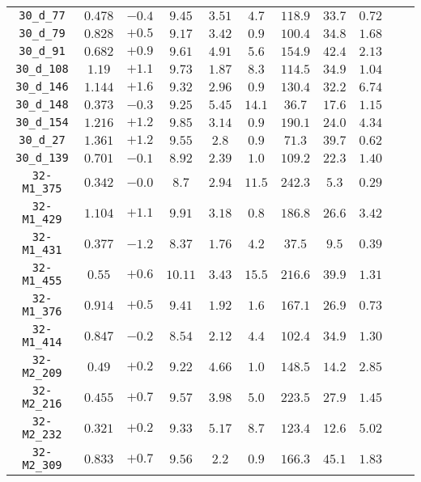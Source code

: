 \begin{table}[htbp]
\begin{tabular}{c c c c c c c c c c c}
\texttt{30\_d\_77}      & $0.478$ & $-0.4$ & $9.45 $ & $3.51 $ & $4.7 $ & $118.9$ & $33.7$ & $0.72$ \\
\texttt{30\_d\_79}      & $0.828$ & $+0.5$ & $9.17 $ & $3.42 $ & $0.9 $ & $100.4$ & $34.8$ & $1.68$ \\
\texttt{30\_d\_91}      & $0.682$ & $+0.9$ & $9.61 $ & $4.91 $ & $5.6 $ & $154.9$ & $42.4$ & $2.13$ \\
\texttt{30\_d\_108}     & $ 1.19$ & $+1.1$ & $9.73 $ & $1.87 $ & $8.3 $ & $114.5$ & $34.9$ & $1.04$ \\
\texttt{30\_d\_146}     & $1.144$ & $+1.6$ & $9.32 $ & $2.96 $ & $0.9 $ & $130.4$ & $32.2$ & $6.74$ \\
\texttt{30\_d\_148}     & $0.373$ & $-0.3$ & $9.25 $ & $5.45 $ & $14.1$ & $36.7 $ & $17.6$ & $1.15$ \\
\texttt{30\_d\_154}     & $1.216$ & $+1.2$ & $9.85 $ & $3.14 $ & $0.9 $ & $190.1$ & $24.0$ & $4.34$ \\
\texttt{30\_d\_27}      & $1.361$ & $+1.2$ & $9.55 $ & $2.8  $ & $0.9 $ & $71.3 $ & $39.7$ & $0.62$ \\
\texttt{30\_d\_139}     & $0.701$ & $-0.1$ & $8.92 $ & $2.39 $ & $1.0 $ & $109.2$ & $22.3$ & $1.40$ \\
\texttt{32-M1\_375}     & $0.342$ & $-0.0$ & $8.7  $ & $2.94 $ & $11.5$ & $242.3$ & $5.3 $ & $0.29$ \\
\texttt{32-M1\_429}     & $1.104$ & $+1.1$ & $9.91 $ & $3.18 $ & $0.8 $ & $186.8$ & $26.6$ & $3.42$ \\
\texttt{32-M1\_431}     & $0.377$ & $-1.2$ & $8.37 $ & $1.76 $ & $4.2 $ & $37.5 $ & $9.5 $ & $0.39$ \\
\texttt{32-M1\_455}     & $ 0.55$ & $+0.6$ & $10.11$ & $3.43 $ & $15.5$ & $216.6$ & $39.9$ & $1.31$ \\
\texttt{32-M1\_376}     & $0.914$ & $+0.5$ & $9.41 $ & $1.92 $ & $1.6 $ & $167.1$ & $26.9$ & $0.73$ \\
\texttt{32-M1\_414}     & $0.847$ & $-0.2$ & $8.54 $ & $2.12 $ & $4.4 $ & $102.4$ & $34.9$ & $1.30$ \\
\texttt{32-M2\_209}     & $ 0.49$ & $+0.2$ & $9.22 $ & $4.66 $ & $1.0 $ & $148.5$ & $14.2$ & $2.85$ \\
\texttt{32-M2\_216}     & $0.455$ & $+0.7$ & $9.57 $ & $3.98 $ & $5.0 $ & $223.5$ & $27.9$ & $1.45$ \\
\texttt{32-M2\_232}     & $0.321$ & $+0.2$ & $9.33 $ & $5.17 $ & $8.7 $ & $123.4$ & $12.6$ & $5.02$ \\
\texttt{32-M2\_309}     & $0.833$ & $+0.7$ & $9.56 $ & $2.2  $ & $0.9 $ & $166.3$ & $45.1$ & $1.83$ \\

\end{tabular}
\end{table}
